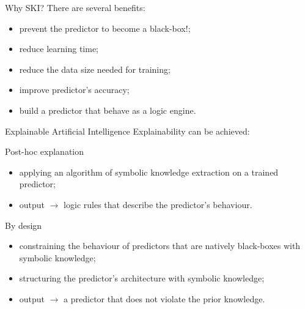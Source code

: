 \documentclass[presentation]{beamer}\mode<presentation>{\usetheme{AMSBolognaFC}}
\begin{document}
\begin{frame}[c]{Why SKI?}
    There are several benefits:
    \begin{itemize}
        \item prevent the predictor to become a black-box\alert{!};
        \item reduce learning time;
        \item reduce the data size needed for training;
        \item improve predictor's accuracy;
        \item build a predictor that behave as a logic engine.
    \end{itemize}
\end{frame}

\begin{frame}[c]{Explainable Artificial Intelligence }
    Explainability can be achieved:
    \begin{block}{Post-hoc explanation}
        \begin{itemize}
            \item applying an algorithm of symbolic knowledge extraction on a trained predictor;
            \item output $\rightarrow$ logic rules that describe the predictor's behaviour.
        \end{itemize}    
    \end{block}
    
    \begin{block}{By design}
        \begin{itemize}
            \item constraining the behaviour of predictors that are natively black-boxes with symbolic knowledge;
            \item structuring the predictor's architecture with symbolic knowledge;
            \item output $\rightarrow$ a predictor that does not violate the prior knowledge.
        \end{itemize}
    \end{block}
    
\end{frame}




\end{document}

